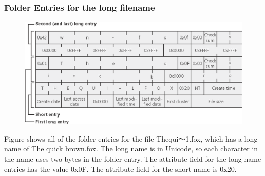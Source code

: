 % 
% 
% 
\begin{frame}[fragile]
    \frametitle{Folder Entries for the long filename}
\begin{figure}
    \includegraphics[width=0.6\linewidth]{figs/FAT-filename.png}
    \end{figure} \pause

    Figure shows all of the folder entries for the file {\color{red}Thequi～1.fox}, which has a long name of {\color{red}The quick brown.fox}. The long name is in Unicode, so each character in the name uses two bytes in the folder entry. The {\color{red}attribute field} for the long name entries has the value {\color{red}0x0F}. The attribute field for the short name is {\color{red}0x20}.
\end{frame}
% 
% 

